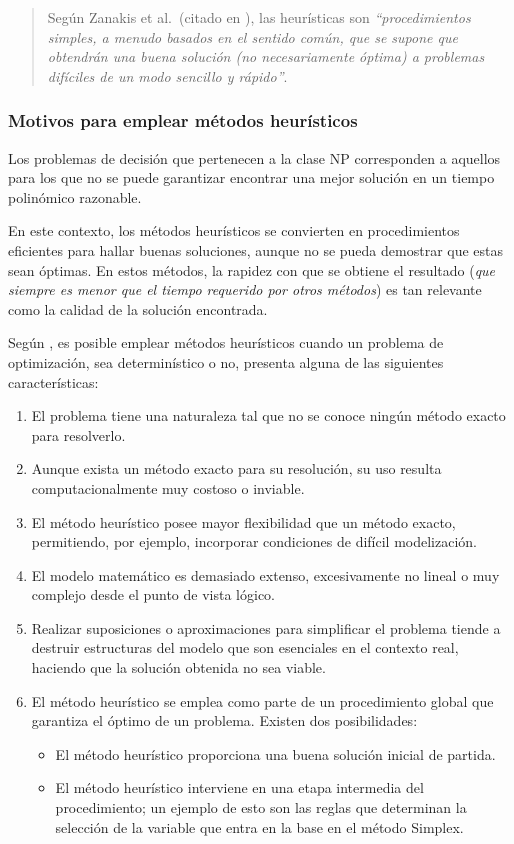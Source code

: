 \documentclass[12pt,titlepage,twoside,openright]{book}
\begin{document}
\begin{quote}
	Según Zanakis et al.\ (citado en \citep{duarte2007metaheuristicas}), las heurísticas son \textit{``procedimientos simples, a menudo basados en el sentido común, que se supone que obtendrán una buena solución (no necesariamente óptima) a problemas difíciles de un modo sencillo y rápido''}.
\end{quote}

\subsubsection{Motivos para emplear métodos heurísticos}

Los problemas de decisión que pertenecen a la clase NP corresponden a aquellos para los que no se puede garantizar encontrar una mejor solución en un tiempo polinómico razonable.

En este contexto, los métodos heurísticos se convierten en procedimientos eficientes para hallar buenas soluciones, aunque no se pueda demostrar que estas sean óptimas. En estos métodos, la rapidez con que se obtiene el resultado (\textit{que siempre es menor que el tiempo requerido por otros métodos}) es tan relevante como la calidad de la solución encontrada.

Según \citep{antonioSuarez2014}, es posible emplear métodos heurísticos cuando un problema de optimización, sea determinístico o no, presenta alguna de las siguientes características:


\begin{enumerate}[label=\alph*.]
	\item El problema tiene una naturaleza tal que no se conoce ningún método exacto para resolverlo.
	\item Aunque exista un método exacto para su resolución, su uso resulta computacionalmente muy costoso o inviable.
	\item El método heurístico posee mayor flexibilidad que un método exacto, permitiendo, por ejemplo, incorporar condiciones de difícil modelización.
	\item El modelo matemático es demasiado extenso, excesivamente no lineal o muy complejo desde el punto de vista lógico.
	\item Realizar suposiciones o aproximaciones para simplificar el problema tiende a destruir estructuras del modelo que son esenciales en el contexto real, haciendo que la solución obtenida no sea viable.
	\item El método heurístico se emplea como parte de un procedimiento global que garantiza el óptimo de un problema. Existen dos posibilidades:
	      \begin{itemize}
		      \item El método heurístico proporciona una buena solución inicial de partida.
		      \item El método heurístico interviene en una etapa intermedia del procedimiento; un ejemplo de esto son las reglas que determinan la selección de la variable que entra en la base en el método Simplex.
	      \end{itemize}
\end{enumerate}
\end{document}
